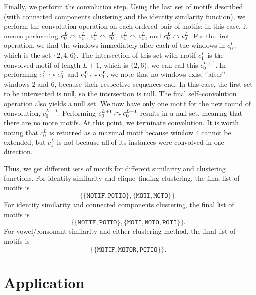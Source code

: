     Finally, we perform the convolution step.  Using the last
    set of motifs described (with connected components clustering and
    the identity similarity function), we perform the convolution
    operation on each ordered pair of motifs; in this case, it means
    performing $c_0^L \curvearrowright c_1^L$, $c_1^L \curvearrowright c_0^L$,
    $c_1^L \curvearrowright c_1^L$, and $c_0^L \curvearrowright c_0^L$.
    For the first operation, we find the windows immediately after
    each of the windows in $c_0^L$, which is the set $\{2, 4, 6\}$.
    The intersection of this set with motif $c_1^L$ is the convolved
    motif of length $L+1$, which is $\{2, 6\}$; we can call this
    $c_0^{L+1}$.  In performing $c_1^L
    \curvearrowright c_0^L$ and $c_1^L \curvearrowright c_1^L$,
    we note that no windows exist ``after'' windows $2$
    and $6$, because their respective sequences end.  In this case,
    the first set to be intersected is null, so the intersection
    is null.  The final self--convolution operation also yields a null
    set.  We now have only one motif for the new round of convolution,
    $c_0^{L+1}$.  Performing $c_0^{L+1} \curvearrowright c_0^{L+1}$ results in
    a null set, meaning that there are no more motifs.  At this point, we
    terminate
    convolution.  It is worth noting that $c_0^L$ is returned as a
    maximal motif because window $4$ cannot be extended, but $c_1^L$ is
    not because all of its instances were convolved in one direction.

    Thus, we get different sets of motifs for different similarity and
    clustering functions.  For identity similarity and clique--finding
    clustering, the final list of motifs is
    \begin{equation*}
    \{\{\texttt{MOTIF},\texttt{POTIO}\},
      \{\texttt{MOTI},\texttt{MOTO}\}\}.
    \end{equation*}
    For identity similarity and connected components clustering, the final
    list of motifs is
    \begin{equation*}
    \{\{\texttt{MOTIF},\texttt{POTIO}\}, \{\texttt{MOTI},\texttt{MOTO},\texttt{POTI}\}\}.
    \end{equation*}
    For vowel/consonant similarity and either clustering method, the final
    list of motifs is
    \begin{equation*}
    \{\{\texttt{MOTIF},\texttt{MOTOR},\texttt{POTIO}\}\}.
    \end{equation*}



\section{Application}

